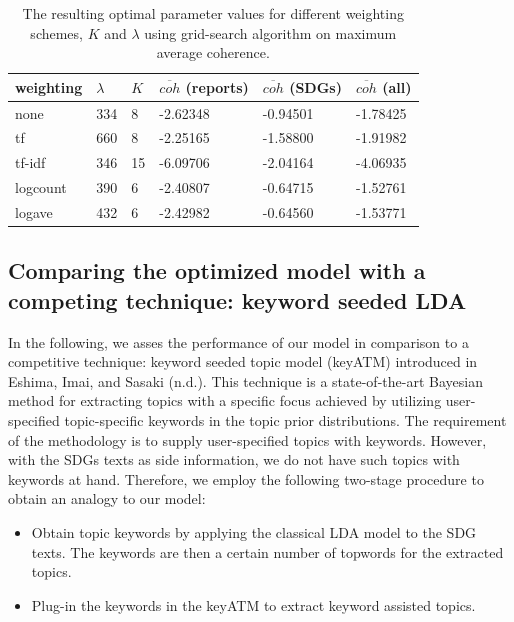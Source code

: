\documentclass[
]{article}
\providecommand{\tightlist}{%
  \setlength{\itemsep}{0pt}\setlength{\parskip}{0pt}}
\begin{document}
\begin{table}

\caption{\label{tab:tab00}The resulting optimal parameter values for different weighting schemes, $K$ and $\lambda$ using grid-search algorithm on maximum average coherence.}
\centering
\begin{tabular}[t]{l|l|l|l|l|l}
\hline
weighting & $\lambda$ & $K$ & $\overline{coh}$ (reports) & $\overline{coh}$ (SDGs) & $\overline{coh}$ (all)\\
\hline
none & 334 & 8 & -2.62348 & -0.94501 & -1.78425\\
\hline
tf & 660 & 8 & -2.25165 & -1.58800 & -1.91982\\
\hline
tf-idf & 346 & 15 & -6.09706 & -2.04164 & -4.06935\\
\hline
logcount & 390 & 6 & -2.40807 & -0.64715 & -1.52761\\
\hline
logave & 432 & 6 & -2.42982 & -0.64560 & -1.53771\\
\hline
\end{tabular}
\end{table}

\hypertarget{comparing-the-optimized-model-with-a-competing-technique-keyword-seeded-lda}{%
\subsection{Comparing the optimized model with a competing technique: keyword seeded LDA}\label{comparing-the-optimized-model-with-a-competing-technique-keyword-seeded-lda}}

In the following, we asses the performance of our model in comparison to a competitive technique: keyword seeded topic model (keyATM) introduced in Eshima, Imai, and Sasaki (n.d.). This technique is a state-of-the-art Bayesian method for extracting topics with a specific focus achieved by utilizing user-specified topic-specific keywords in the topic prior distributions. The requirement of the methodology is to supply user-specified topics with keywords. However, with the SDGs texts as side information, we do not have such topics with keywords at hand. Therefore, we employ the following two-stage procedure to obtain an analogy to our model:

\begin{itemize}
\tightlist
\item
  Obtain topic keywords by applying the classical LDA model to the SDG texts. The keywords are then a certain number of topwords for the extracted topics.
\item
  Plug-in the keywords in the keyATM to extract keyword assisted topics.
\end{itemize}
\end{document}
